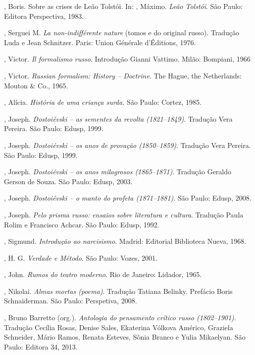 \begin{Parskip}
{, Boris. Sobre as crises de Leão Tolstói. In: , Máximo. \emph{Leão Tolstói}. São Paulo: Editora Perspectiva, 1983.

, Serguei M. \emph{La non-indifférente nature } (tomos 
e  do original russo). Tradução Luda e Jean Schnitzer. Paris: Union Générale d'Éditions, 1976.

, Victor. \emph{Il formalismo russo}. Introdução Gianni Vattimo. Milão: Bompiani, 1966

, Victor. \emph{Russian formalism: History -- Doctrine}. The Hague,
the Netherlands: Mouton \& Co., 1965.

, Alícia. \emph{História de uma criança surda.} São Paulo: Cortez, 1985.

, Joseph. \emph{Dostoiévski -- as sementes da revolta (1821--1849)}. Tradução Vera Pereira. São Paulo: Edusp, 1999.

, Joseph. \emph{Dostoiévski -- os anos de provação (1850--1859)}. Tradução Vera Pereira. São Paulo: Edusp, 1999.

, Joseph. \emph{Dostoiévski -- os anos milagrosos (1865--1871)}. Tradução Geraldo Gerson de Souza. São Paulo: Edusp, 2003.

, Joseph. \emph{Dostoiévski -- o manto do profeta (1871--1881)}. São Paulo: Edusp, 2008.

, Joseph. \emph{Pelo prisma russo: ensaios sobre literatura e cultura}. Tradução Paula Rolim e Francisco Achcar. São Paulo: Edusp, 1992.

, Sigmund. \emph{Introdução ao narcisismo}. Madrid: Editorial Biblioteca Nueva, 1968.

, H. G. \emph{Verdade e Método}. São Paulo: Vozes, 2001.

, John. \emph{Rumos do teatro moderno}. Rio de Janeiro: Lidador, 1965.

, Nikolai. \emph{Almas mortas (poema)}. Tradução Tatiana Belinky. Prefácio Boris Schnaiderman. São Paulo: Perspetiva, 2008.

, Bruno Barretto (org.). \emph{Antologia do pensamento crítico russo (1802--1901)}. Tradução Cecília Rosas, Denise Sales, Ekaterina Vólkova Américo, Graziela Schneider, Mário Ramos, Renata Esteves, Sônia Branco e Yulia Mikaelyan. São Paulo: Editora 34, 2013.

}
\end{Parskip}
